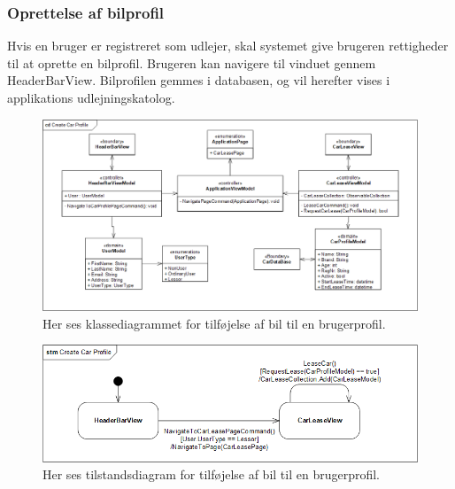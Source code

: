 \documentclass[Rapport/Rapport_main.tex]{subfiles}
\begin{document}
\subsubsection{Oprettelse af bilprofil}
Hvis en bruger er registreret som udlejer, skal systemet give brugeren rettigheder til at oprette en bilprofil. Brugeren kan navigere til vinduet gennem HeaderBarView. Bilprofilen gemmes i databasen, og vil herefter vises i applikations udlejningskatolog.
\begin{figure}[H]
    \centering
    \includegraphics[width=1\textwidth]{Arkitektur/Softwarearkitektur/Car_registration/graphics/RegisterCarProfileCD.png}
    \caption{Her ses klassediagrammet for tilføjelse af bil til en brugerprofil. }
    \label{fig:RegisterCarProfileCD}
\end{figure}

\begin{figure}[H]
    \centering
    \includegraphics[width=1\textwidth]{Arkitektur/Softwarearkitektur/Car_registration/graphics/RegisterCarProfileSTM.png}
    \caption{Her ses tilstandsdiagram for tilføjelse af bil til en brugerprofil. }
    \label{fig:RegisterCarProfileSTM}
\end{figure}
\end{document}
